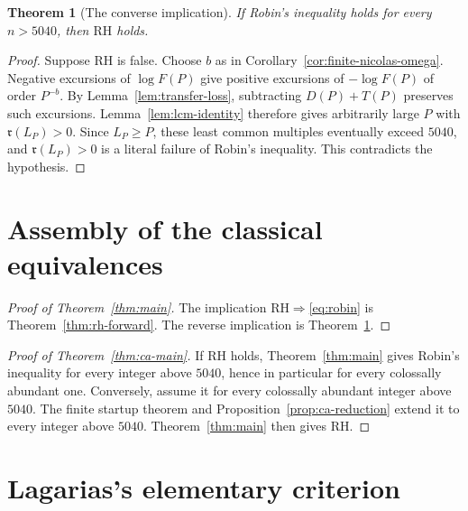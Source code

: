 \documentclass[11pt]{amsart}
\newtheorem{theorem}{Theorem}[section]
\theoremstyle{definition}
\theoremstyle{remark}
\numberwithin{equation}{section}
\newcommand{\RH}{\mathrm{RH}}
\newcommand{\M}{\mathfrak r}
\begin{document}
\begin{theorem}[The converse implication]\label{thm:converse}
If Robin's inequality holds for every $n>5040$, then $\RH$ holds.
\end{theorem}

\begin{proof}
Suppose $\RH$ is false.  Choose $b$ as in
Corollary~\ref{cor:finite-nicolas-omega}.  Negative excursions of
$\log F(P)$ give positive excursions of $-\log F(P)$ of order $P^{-b}$.
By Lemma~\ref{lem:transfer-loss}, subtracting $D(P)+T(P)$ preserves such
excursions.  Lemma~\ref{lem:lcm-identity} therefore gives arbitrarily large
$P$ with $\M(L_P)>0$.  Since $L_P\ge P$, these least common multiples
eventually exceed $5040$, and $\M(L_P)>0$ is a literal failure of Robin's
inequality.  This contradicts the hypothesis.
\end{proof}

\section{Assembly of the classical equivalences}

\begin{proof}[Proof of Theorem~\ref{thm:main}]
The implication $\RH\Rightarrow$\eqref{eq:robin} is
Theorem~\ref{thm:rh-forward}.  The reverse implication is
Theorem~\ref{thm:converse}.
\end{proof}

\begin{proof}[Proof of Theorem~\ref{thm:ca-main}]
If $\RH$ holds, Theorem~\ref{thm:main} gives Robin's inequality for every
integer above $5040$, hence in particular for every colossally abundant one.
Conversely, assume it for every colossally abundant integer above $5040$.
The finite startup theorem and Proposition~\ref{prop:ca-reduction} extend it
to every integer above $5040$.  Theorem~\ref{thm:main} then gives $\RH$.
\end{proof}

\section{Lagarias's elementary criterion}\label{sec:lagarias}
\end{document}
